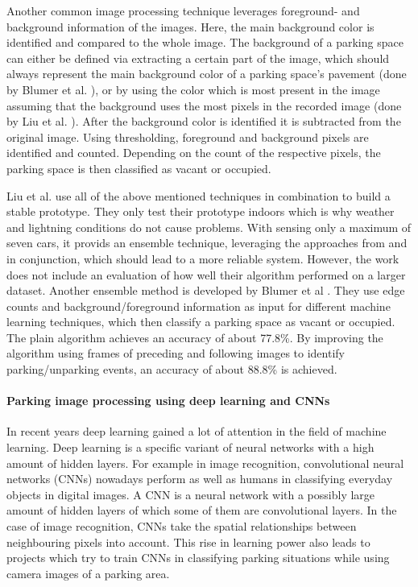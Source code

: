 Another common image processing technique leverages foreground- and background information of the images. Here, the main background color is identified and compared to the whole image. The background of a parking space can either be defined via extracting a certain part of the image, which should always represent the main background color of a parking space's pavement (done by Blumer et al. \cite{Blumer2012}), or by using the color which is most present in the image assuming that the background uses the most pixels in the recorded image (done by Liu et al. \cite{stationary_camera_sensing}). After the background color is identified it is subtracted from the original image. Using thresholding, foreground and background pixels are identified and counted. Depending on the count of the respective pixels, the parking space is then classified as vacant or occupied.

Liu et al. \cite{stationary_camera_sensing} use all of the above mentioned techniques in combination to build a stable prototype. They only test their prototype indoors which is why weather and lightning conditions do not cause problems. With sensing only a maximum of seven cars, it provids an ensemble technique, leveraging the approaches from \cite{Blumer2012} and \cite{stationary_camera_sensing} in conjunction, which should lead to a more reliable system. However, the work does not include an evaluation of how well their algorithm performed on a larger dataset. Another ensemble method is developed by Blumer et al \cite{Blumer2012}. They use edge counts and background/foreground information as input for different machine learning techniques, which then classify a parking space as vacant or occupied. The plain algorithm achieves an accuracy of about 77.8\%. By improving the algorithm using frames of preceding and following images to identify parking/unparking events, an accuracy of about 88.8\% is achieved.



\paragraph{Parking image processing using deep learning and CNNs}

In recent years deep learning gained a lot of attention in the field of machine learning. Deep learning is a specific variant of neural networks with a high amount of hidden layers. For example in image recognition, convolutional neural networks (CNNs) nowadays perform as well as humans in classifying everyday objects in digital images. A CNN is a neural network with a possibly large amount of hidden layers of which some of them are convolutional layers. In the case of image recognition, CNNs take the spatial relationships between neighbouring pixels into account. This rise in learning power also leads to projects which try to train CNNs in classifying parking situations while using camera images of a parking area.

